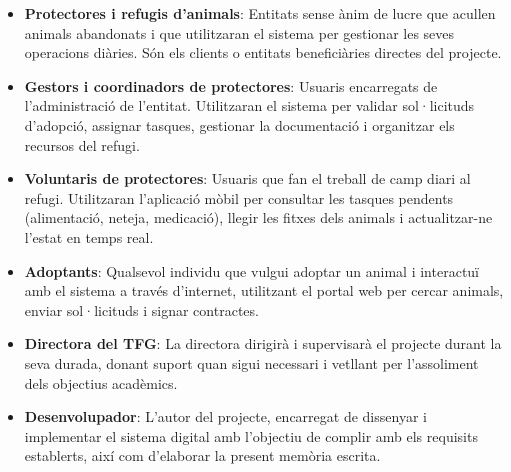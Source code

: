 \documentclass[11pt,a4paper]{report}
\begin{document}
\begin{itemize}
    \item \textbf{Protectores i refugis d’animals}: Entitats sense ànim de lucre que acullen animals abandonats i que utilitzaran el sistema per gestionar les seves operacions diàries. Són els clients o entitats beneficiàries directes del projecte.
    
    \item \textbf{Gestors i coordinadors de protectores}: Usuaris encarregats de l'administració de l'entitat. Utilitzaran el sistema per validar sol·licituds d'adopció, assignar tasques, gestionar la documentació i organitzar els recursos del refugi.
    
    \item \textbf{Voluntaris de protectores}: Usuaris que fan el treball de camp diari al refugi. Utilitzaran l'aplicació mòbil per consultar les tasques pendents (alimentació, neteja, medicació), llegir les fitxes dels animals i actualitzar-ne l'estat en temps real.
    
    \item \textbf{Adoptants}: Qualsevol individu que vulgui adoptar un animal i interactuï amb el sistema a través d’internet, utilitzant el portal web per cercar animals, enviar sol·licituds i signar contractes.
    
    \item \textbf{Directora del TFG}: La directora dirigirà i supervisarà el projecte durant la seva durada, donant suport quan sigui necessari i vetllant per l'assoliment dels objectius acadèmics.
    
    \item \textbf{Desenvolupador}: L'autor del projecte, encarregat de dissenyar i implementar el sistema digital amb l’objectiu de complir amb els requisits establerts, així com d'elaborar la present memòria escrita.
\end{itemize}
\end{document}
